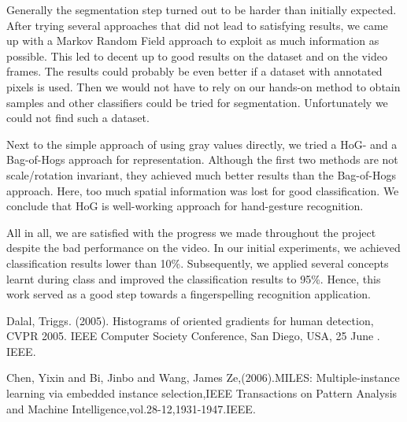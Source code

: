 \documentclass[letterpaper, 10 pt, conference]{ieeeconf}  %
\begin{document}
Generally the segmentation step turned out to be harder than initially expected. After trying several approaches that did not lead to satisfying results, we came up with a Markov Random Field approach to exploit as much information as possible. This led to decent up to good results on the dataset and on the video frames. The results could probably be even better if a dataset with annotated pixels is used. Then we would not have to rely on our hands-on method to obtain samples and other classifiers could be tried for segmentation. Unfortunately we could not find such a dataset.

Next to the simple approach of using gray values directly, we tried a HoG- and a Bag-of-Hogs approach for representation. Although the first two methods are not scale/rotation invariant, they achieved much better results than the Bag-of-Hogs approach. Here, too much spatial information was lost for good classification. We conclude that HoG is well-working approach for hand-gesture recognition.

All in all, we are satisfied with the progress we made throughout the project despite the bad performance on the video. In our initial experiments, we achieved classification results lower than 10\%. Subsequently, we applied several concepts learnt during class and improved the classification results to 95\%. Hence, this work served as a good step towards a fingerspelling recognition application.

\addtolength{\textheight}{-12cm}   %




\begin{thebibliography}{99}

 Dalal, Triggs. (2005). Histograms of oriented gradients for human detection, CVPR 2005. IEEE Computer Society Conference, San Diego, USA, 25 June . IEEE.

Chen, Yixin and Bi, Jinbo and Wang, James Ze,(2006).MILES: Multiple-instance learning via embedded instance selection,IEEE Transactions on Pattern Analysis and Machine Intelligence,vol.28-12,1931-1947.IEEE.



\end{thebibliography}


\end{document}
